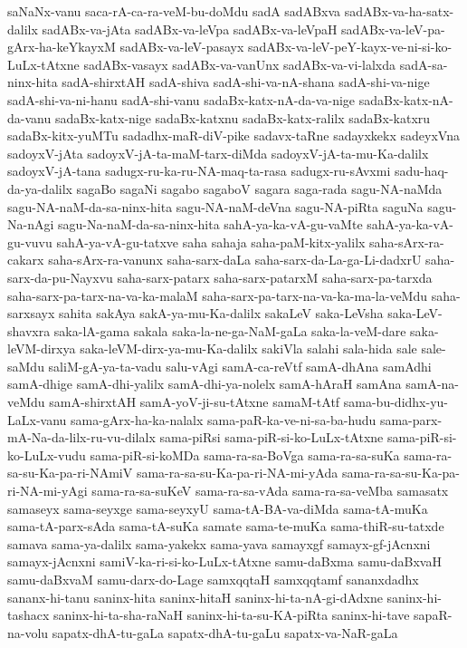 {saNaNx-vanu
saca-rA-ca-ra-veM-bu-doMdu
sadA
sadABxva
sadABx-va-ha-satx-dalilx
sadABx-va-jAta
sadABx-va-leVpa
sadABx-va-leVpaH
sadABx-va-leV-pa-gArx-ha-keYkayxM
sadABx-va-leV-pasayx
sadABx-va-leV-peY-kayx-ve-ni-si-ko-LuLx-tAtxne
sadABx-vasayx
sadABx-va-vanUnx
sadABx-va-vi-lalxda
sadA-sa-ninx-hita
sadA-shirxtAH
sadA-shiva
sadA-shi-va-nA-shana
sadA-shi-va-nige
sadA-shi-va-ni-hanu
sadA-shi-vanu
sadaBx-katx-nA-da-va-nige
sadaBx-katx-nA-da-vanu
sadaBx-katx-nige
sadaBx-katxnu
sadaBx-katx-ralilx
sadaBx-katxru
sadaBx-kitx-yuMTu
sadadhx-maR-diV-pike
sadavx-taRne
sadayxkekx
sadeyxVna
sadoyxV-jAta
sadoyxV-jA-ta-maM-tarx-diMda
sadoyxV-jA-ta-mu-Ka-dalilx
sadoyxV-jA-tana
sadugx-ru-ka-ru-NA-maq-ta-rasa
sadugx-ru-sAvxmi
sadu-haq-da-ya-dalilx
sagaBo
sagaNi
sagabo
sagaboV
sagara
saga-rada
sagu-NA-naMda
sagu-NA-naM-da-sa-ninx-hita
sagu-NA-naM-deVna
sagu-NA-piRta
saguNa
sagu-Na-nAgi
sagu-Na-naM-da-sa-ninx-hita
sahA-ya-ka-vA-gu-vaMte
sahA-ya-ka-vA-gu-vuvu
sahA-ya-vA-gu-tatxve
saha
sahaja
saha-paM-kitx-yalilx
saha-sArx-ra-cakarx
saha-sArx-ra-vanunx
saha-sarx-daLa
saha-sarx-da-La-ga-Li-dadxrU
saha-sarx-da-pu-Nayxvu
saha-sarx-patarx
saha-sarx-patarxM
saha-sarx-pa-tarxda
saha-sarx-pa-tarx-na-va-ka-malaM
saha-sarx-pa-tarx-na-va-ka-ma-la-veMdu
saha-sarxsayx
sahita
sakAya
sakA-ya-mu-Ka-dalilx
sakaLeV
saka-LeVsha
saka-LeV-shavxra
saka-lA-gama
sakala
saka-la-ne-ga-NaM-gaLa
saka-la-veM-dare
saka-leVM-dirxya
saka-leVM-dirx-ya-mu-Ka-dalilx
sakiVla
salahi
sala-hida
sale
sale-saMdu
saliM-gA-ya-ta-vadu
salu-vAgi
samA-ca-reVtf
samA-dhAna
samAdhi
samA-dhige
samA-dhi-yalilx
samA-dhi-ya-nolelx
samA-hAraH
samAna
samA-na-veMdu
samA-shirxtAH
samA-yoV-ji-su-tAtxne
samaM-tAtf
sama-bu-didhx-yu-LaLx-vanu
sama-gArx-ha-ka-nalalx
sama-paR-ka-ve-ni-sa-ba-hudu
sama-parx-mA-Na-da-lilx-ru-vu-dilalx
sama-piRsi
sama-piR-si-ko-LuLx-tAtxne
sama-piR-si-ko-LuLx-vudu
sama-piR-si-koMDa
sama-ra-sa-BoVga
sama-ra-sa-suKa
sama-ra-sa-su-Ka-pa-ri-NAmiV
sama-ra-sa-su-Ka-pa-ri-NA-mi-yAda
sama-ra-sa-su-Ka-pa-ri-NA-mi-yAgi
sama-ra-sa-suKeV
sama-ra-sa-vAda
sama-ra-sa-veMba
samasatx
samaseyx
sama-seyxge
sama-seyxyU
sama-tA-BA-va-diMda
sama-tA-muKa
sama-tA-parx-sAda
sama-tA-suKa
samate
sama-te-muKa
sama-thiR-su-tatxde
samava
sama-ya-dalilx
sama-yakekx
sama-yava
samayxgf
samayx-gf-jAcnxni
samayx-jAcnxni
samiV-ka-ri-si-ko-LuLx-tAtxne
samu-daBxma
samu-daBxvaH
samu-daBxvaM
samu-darx-do-Lage
samxqqtaH
samxqqtamf
sananxdadhx
sananx-hi-tanu
saninx-hita
saninx-hitaH
saninx-hi-ta-nA-gi-dAdxne
saninx-hi-tashacx
saninx-hi-ta-sha-raNaH
saninx-hi-ta-su-KA-piRta
saninx-hi-tave
sapaR-na-volu
sapatx-dhA-tu-gaLa
sapatx-dhA-tu-gaLu
sapatx-va-NaR-gaLa
}
